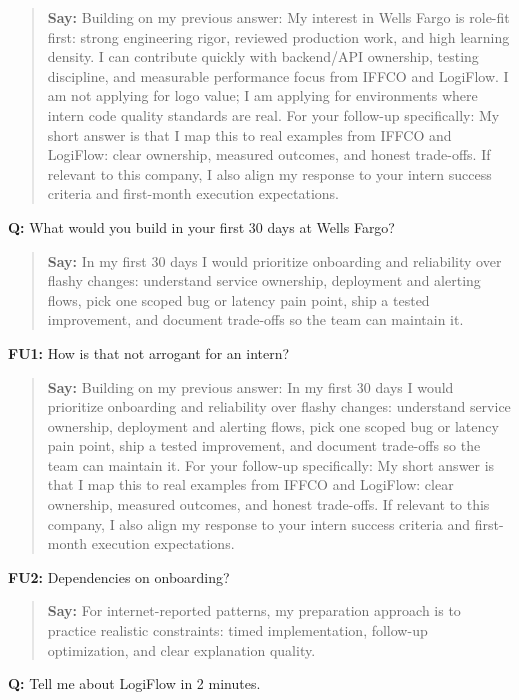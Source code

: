 \documentclass[9pt,a4paper]{article}
\begin{document}
\begin{quote}\small\textbf{Say:} Building on my previous answer: My interest in Wells Fargo is role-fit first: strong engineering rigor, reviewed production work, and high learning density. I can contribute quickly with backend/API ownership, testing discipline, and measurable performance focus from IFFCO and LogiFlow. I am not applying for logo value; I am applying for environments where intern code quality standards are real. For your follow-up specifically: My short answer is that I map this to real examples from IFFCO and LogiFlow: clear ownership, measured outcomes, and honest trade-offs. If relevant to this company, I also align my response to your intern success criteria and first-month execution expectations.\end{quote}
\vspace{2mm}
\textbf{Q:} What would you build in your first 30 days at Wells Fargo?

\begin{quote}\small\textbf{Say:} In my first 30 days I would prioritize onboarding and reliability over flashy changes: understand service ownership, deployment and alerting flows, pick one scoped bug or latency pain point, ship a tested improvement, and document trade-offs so the team can maintain it.\end{quote}
\vspace{2mm}
\textbf{FU1:} How is that not arrogant for an intern?

\begin{quote}\small\textbf{Say:} Building on my previous answer: In my first 30 days I would prioritize onboarding and reliability over flashy changes: understand service ownership, deployment and alerting flows, pick one scoped bug or latency pain point, ship a tested improvement, and document trade-offs so the team can maintain it. For your follow-up specifically: My short answer is that I map this to real examples from IFFCO and LogiFlow: clear ownership, measured outcomes, and honest trade-offs. If relevant to this company, I also align my response to your intern success criteria and first-month execution expectations.\end{quote}
\vspace{2mm}
\textbf{FU2:} Dependencies on onboarding?

\begin{quote}\small\textbf{Say:} For internet-reported patterns, my preparation approach is to practice realistic constraints: timed implementation, follow-up optimization, and clear explanation quality.\end{quote}
\vspace{2mm}
\textbf{Q:} Tell me about LogiFlow in 2 minutes.
\end{document}
